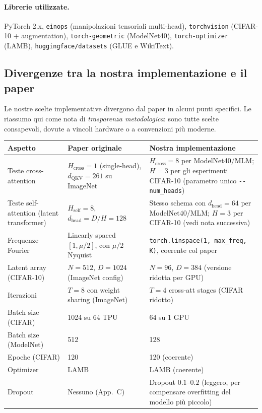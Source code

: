 \documentclass[
  11pt,
]{article}
\begin{document}
\paragraph{Librerie utilizzate.} PyTorch 2.x, \texttt{einops} (manipolazioni tensoriali multi-head), \texttt{torchvision} (CIFAR-10 + augmentation), \texttt{torch-geometric} (ModelNet40), \texttt{torch-optimizer} (LAMB), \texttt{huggingface/datasets} (GLUE e WikiText).

\subsection{Divergenze tra la nostra implementazione e il paper}
\label{sec:progetto-divergenze}

Le nostre scelte implementative divergono dal paper in alcuni punti specifici. Le riassumo qui come nota di \emph{trasparenza metodologica}: sono tutte scelte consapevoli, dovute a vincoli hardware o a convenzioni più moderne.

\begin{center}
{\small
\begin{tabular}{@{}p{4cm}p{5cm}p{5cm}@{}}
\toprule
\textbf{Aspetto} & \textbf{Paper originale} & \textbf{Nostra implementazione} \\
\midrule
Teste cross-attention & $H_{\text{cross}} = 1$ (single-head), $d_{\text{QKV}} = 261$ su ImageNet & $H_{\text{cross}} = 8$ per ModelNet40/MLM; $H = 3$ per gli esperimenti CIFAR-10 (parametro unico \texttt{-{}-num\_heads}) \\
Teste self-attention (latent transformer) & $H_{\text{self}} = 8$, $d_{\text{head}} = D/H = 128$ & Stesso schema con $d_{\text{head}} = 64$ per ModelNet40/MLM; $H=3$ per CIFAR-10 (vedi nota successiva) \\
Frequenze Fourier & Linearly spaced $[1, \mu/2]$, con $\mu/2$ Nyquist & \texttt{torch.linspace(1, max\_freq, K)}, coerente col paper \\
Latent array (CIFAR-10) & $N=512$, $D=1024$ (ImageNet config) & $N=96$, $D=384$ (versione ridotta per GPU) \\
Iterazioni & $T=8$ con weight sharing (ImageNet) & $T=4$ cross-att stages (CIFAR ridotto) \\
Batch size (CIFAR) & 1024 su 64 TPU & $64$ su 1 GPU \\
Batch size (ModelNet) & 512 & 128 \\
Epoche (CIFAR) & 120 & 120 (coerente) \\
Optimizer & LAMB & LAMB (coerente) \\
Dropout & Nessuno (App.\ C) & Dropout $0.1$--$0.2$ (leggero, per compensare overfitting del modello più piccolo) \\
\bottomrule
\end{tabular}
}
\end{center}
\end{document}
